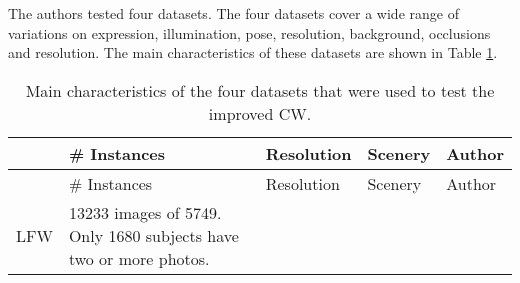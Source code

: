 \documentclass[17pt,]{extarticle}
\begin{document}
The authors tested four datasets. The four datasets cover a wide range of variations on expression, illumination, pose, resolution, background, occlusions and resolution. The main characteristics of these datasets are shown in Table \ref{tab:table1}.

\small

\begin{longtable}[]{@{}lllll@{}}
\caption{\label{tab:table1} Main characteristics of the four datasets that were used to test the improved CW.}\tabularnewline
\toprule
\begin{minipage}[b]{0.09\columnwidth}\raggedright
\strut
\end{minipage} & \begin{minipage}[b]{0.24\columnwidth}\raggedright
\# Instances\strut
\end{minipage} & \begin{minipage}[b]{0.14\columnwidth}\raggedright
Resolution\strut
\end{minipage} & \begin{minipage}[b]{0.19\columnwidth}\raggedright
Scenery\strut
\end{minipage} & \begin{minipage}[b]{0.20\columnwidth}\raggedright
Author\strut
\end{minipage}\tabularnewline
\midrule
\endfirsthead
\toprule
\begin{minipage}[b]{0.09\columnwidth}\raggedright
\strut
\end{minipage} & \begin{minipage}[b]{0.24\columnwidth}\raggedright
\# Instances\strut
\end{minipage} & \begin{minipage}[b]{0.14\columnwidth}\raggedright
Resolution\strut
\end{minipage} & \begin{minipage}[b]{0.19\columnwidth}\raggedright
Scenery\strut
\end{minipage} & \begin{minipage}[b]{0.20\columnwidth}\raggedright
Author\strut
\end{minipage}\tabularnewline
\midrule
\endhead
\begin{minipage}[t]{0.09\columnwidth}\raggedright
LFW\strut
\end{minipage} & \begin{minipage}[t]{0.24\columnwidth}\raggedright
13233 images of 5749. Only 1680 subjects have two or more photos.\strut
\end{minipage} & \begin{minipage}[t]{0.14\columnwidth}\raggedright

\end{minipage}
\end{longtable}
\end{document}
